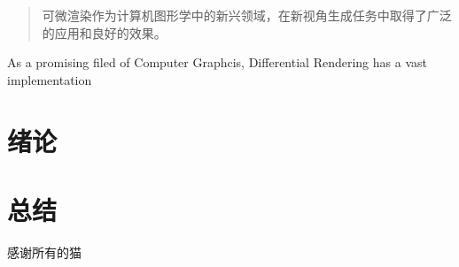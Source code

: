 \documentclass[master,oneside,winfonts]{njuthesis/njuthesis}
\author{朱子航}
\institute{南京大学}
\date{2023年5月13日}
\begin{document}
\maketitle
\makeenglishtitle
{}
\begin{spacing}{1.25}
    \begin{abstract}
        可微渲染作为计算机图形学中的新兴领域，在新视角生成任务中取得了广泛的应用和良好的效果。
    \end{abstract}
\end{spacing}

\begin{spacing}{1.15}
    \begin{englishabstract}
        As a promising filed of Computer Graphcis, Differential Rendering has a vast implementation
    \end{englishabstract}
\end{spacing}
\begin{spacing}{1}
    \renewcommand*\contentsname{目录}
    \tableofcontents
\end{spacing}

\mainmatter

\chapter{绪论}\label{chapter_introduction}


\chapter{总结}\label{chapter_conclusion}


\backmatter 

\begin{acknowledgement}
    感谢所有的猫
\end{acknowledgement}

\begin{spacing}{0.2}
    
\end{spacing}
\end{document}
